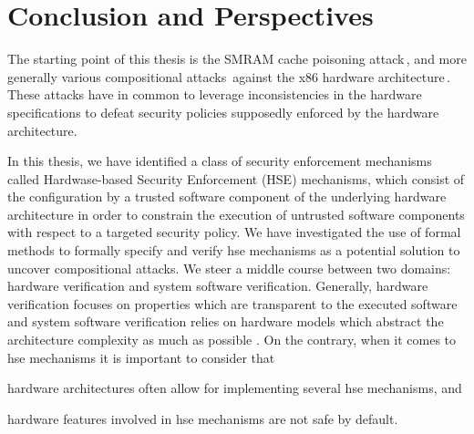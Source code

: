 \chapter{Conclusion and Perspectives}
\label{chapter:conclusion}


\vspace{1cm}%
\noindent
%
The starting point of this thesis is the SMRAM cache poisoning
attack\,\cite{duflot2009smram,wojtczuk2009smram}, and more generally various
compositional attacks\,\cite{wing2003compositionalattack} against the x86
hardware
architecture\,\cite{kovah2015senter,domas2015sinkhole,kallenberg2015racecondition}.
%
These attacks have in common to leverage inconsistencies in the hardware
specifications to defeat security policies supposedly enforced by the hardware
architecture.

In this thesis, we have identified a class of security enforcement mechanisms
called Hardwase-based Security Enforcement (HSE) mechanisms, which consist of
the configuration by a trusted software component of the underlying hardware
architecture in order to constrain the execution of untrusted software
components with respect to a targeted security policy.
%
We have investigated the use of formal methods to formally specify and verify
\ac{hse} mechanisms as a potential solution to uncover compositional attacks.
%
We steer a middle course between two domains: hardware verification and system
software verification.
%
Generally, hardware verification focuses on properties which are transparent to
the executed software and system software verification relies on hardware models
which abstract the architecture complexity as much as possible .
%
On the contrary, when it comes to \ac{hse} mechanisms it is important to
consider that
%
\begin{inparaenum}[(1)]
\item \label{needreuse}%
  hardware architectures often allow for implementing several \ac{hse}
  mechanisms, and
\item \label{needreduce}%
  hardware features involved in \ac{hse} mechanisms are not safe by default.
\end{inparaenum}

